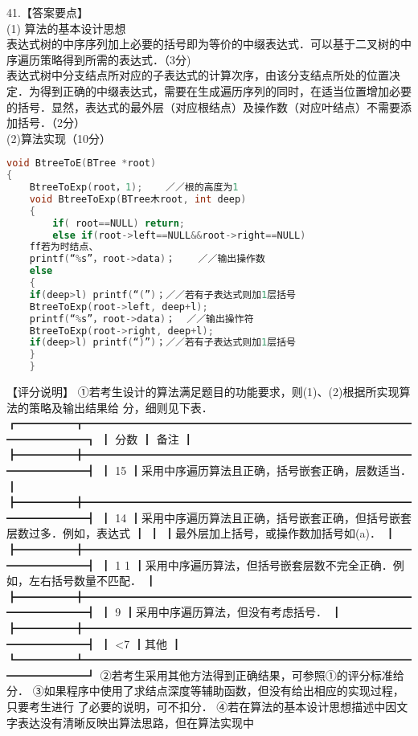 41.【答案要点】 \\
(1) 算法的基本设计思想 \\
表达式树的中序序列加上必要的括号即为等价的中缀表达式．可以基于二叉树的中序遍历策略得到所需的表达式．（3分) \\
表达式树中分支结点所对应的子表达式的计算次序，由该分支结点所处的位置决定．为得到正确的中缀表达式，需要在生成遍历序列的同时，在适当位置增加必要的括号．显然，表达式的最外层（对应根结点）及操作数（对应叶结点）不需要添加括号．（2分） \\
(2)算法实现（10分） \\
\begin{lstlisting}[language=cpp]
void BtreeToE(BTree *root)
{
    BtreeToExp(root，1);    ／／根的高度为1
    void BtreeToExp(BTree木root, int deep)
    {
        if( root==NULL) return;
        else if(root->left==NULL&&root->right==NULL)
    ff若为时结点、
    printf(“%s”，root->data)；    ／／输出操作数
    else
    {
    if(deep>l) printf(“(”)；／／若有子表达式则加1层括号
    BtreeToExp(root->left, deep+l);
    printf(“%s”，root->data)；  ／／输出操怍符
    BtreeToExp(root->right, deep+l);
    if(deep>l) printf(“)”)；／／若有子表达式则加1层括号
    }
    }
    \end{lstlisting}
    【评分说明】
    ①若考生设计的算法满足题目的功能要求，则(1)、(2)根据所实现算法的策略及输出结果给
分，细则见下表．
┏━━━━━┳━━━━━━━━━━━━━━━━━━━━━━━━━━━━━━━━━━━━┓
┃    分数  ┃    备注                                                                ┃
┣━━━━━╋━━━━━━━━━━━━━━━━━━━━━━━━━━━━━━━━━━━━┫
┃    15    ┃采用中序遍历算法且正确，括号嵌套正确，层数适当．                        ┃
┣━━━━━╋━━━━━━━━━━━━━━━━━━━━━━━━━━━━━━━━━━━━┫
┃    14    ┃采用中序遍历算法且正确，括号嵌套正确，但括号嵌套层数过多．例如，表达式  ┃
┃          ┃最外层加上括号，或操作数加括号如(a)．                                   ┃
┣━━━━━╋━━━━━━━━━━━━━━━━━━━━━━━━━━━━━━━━━━━━┫
┃    1 1   ┃采用中序遍历算法，但括号嵌套层数不完全正确．例如，左右括号数量不匹配．  ┃
┣━━━━━╋━━━━━━━━━━━━━━━━━━━━━━━━━━━━━━━━━━━━┫
┃    9     ┃采用中序遍历算法，但没有考虑括号．                                      ┃
┣━━━━━╋━━━━━━━━━━━━━━━━━━━━━━━━━━━━━━━━━━━━┫
┃    <7    ┃其他                                                                    ┃
┗━━━━━┻━━━━━━━━━━━━━━━━━━━━━━━━━━━━━━━━━━━━┛
  ②若考生采用其他方法得到正确结果，可参照①的评分标准给分．
  ③如果程序中使用了求结点深度等辅助函数，但没有给出相应的实现过程，只要考生进行
了必要的说明，可不扣分．
    ④若在算法的基本设计思想描述中因文字表达没有清晰反映出算法思路，但在算法实现中